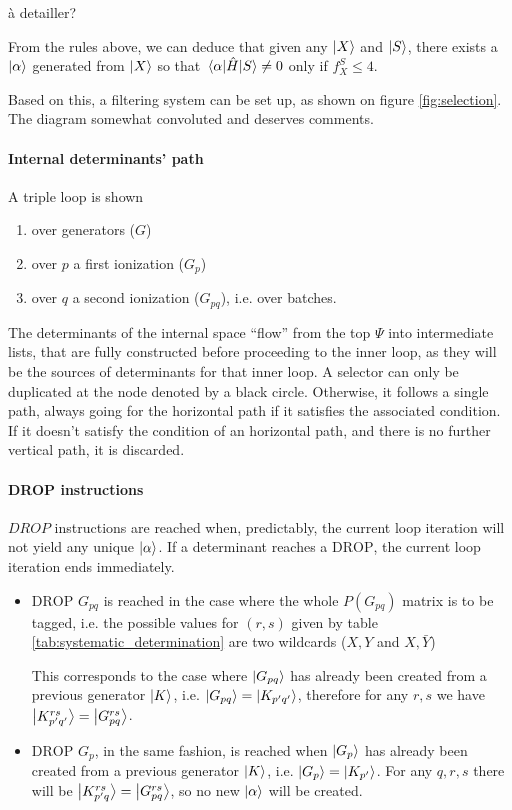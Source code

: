 \documentclass[./thesis.tex]{subfiles}
\begin{document}
\alert{à detailler?}

From the rules above, we can deduce that given any $\ket X$ and $\ket S$, there exists a ${\ket{\alpha}}$ generated from $\ket X$ so that $\mel{\alpha}{\hat{H}}{S} \neq 0$ only if $f_X^S \leq 4$.

Based on this, a filtering system can be set up, as shown on figure \ref{fig:selection}. The diagram somewhat convoluted and deserves comments.

\paragraph{Internal determinants' path}
 
A triple loop is shown

\begin{enumerate}
\item
over generators ($G$)
\item
over $p$ a first ionization ($G_p$)
\item
over $q$ a second ionization ($G_{pq}$), i.e. over batches.
\end{enumerate}

The determinants of the internal space ``flow'' from the top $\Psi$ into intermediate lists, that are fully constructed before proceeding to the inner loop, as they will be the sources of determinants for that inner loop.
A selector can only be duplicated at the node denoted by a black circle. Otherwise, it follows a single path, always going for the horizontal path if it satisfies the associated condition.
If it doesn't satisfy the condition of an horizontal path, and there is no further vertical path, it is discarded.

\paragraph{DROP instructions}
$DROP$ instructions are reached when, predictably, the current loop iteration will not yield any unique ${\ket{\alpha}}$. If a determinant reaches a $\text{DROP}$, the current loop iteration ends immediately.

\begin{itemize}
\item
$\text{DROP } G_{pq}$ is reached in the case where the whole $P(G_{pq})$ matrix is to be tagged, i.e. the possible values for $(r,s)$ given by table \ref{tab:systematic_determination} are two wildcards ($X,Y$ and $X,\bar Y$)

This corresponds to the case where $\ket {G_{pq}}$ has already been created from a previous generator $\ket K$, i.e. $\ket {G_{pq}} = \ket {K_{p'q'}}$, therefore for any $r,s$ we have $\ket {K_{p'q'}^{rs}} = \ket {G_{pq}^{rs}}$.\\
\item
$\text{DROP } G_{p}$, in the same fashion, is reached when $\ket {G_{p}}$ has already been created from a previous generator $\ket K$, i.e. $\ket {G_{p}} = \ket{K_{p'}}$. For any $q,r,s$ there will be $\ket {K_{p'q}^{rs}} = \ket {G_{pq}^{rs}}$, so no new ${\ket{\alpha}}$ will be created.
\end{itemize}
\end{document}
